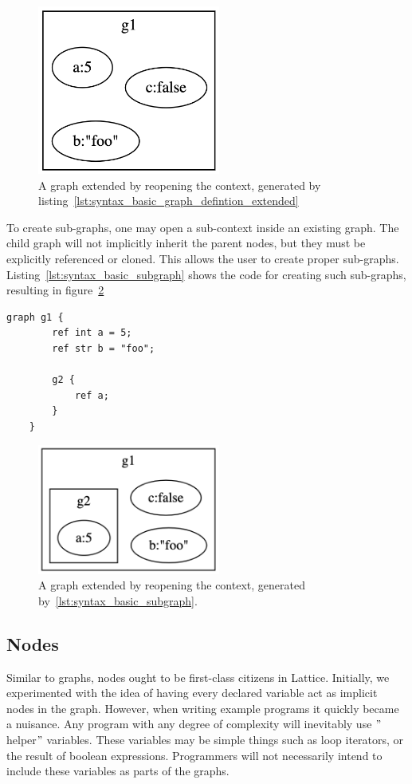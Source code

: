 \begin{figure}[H]
    \centering
    \includegraphics[width=6cm]{figures/syntax_section/syntax_basic_graph_extended}
    \caption{A graph extended by reopening the context, generated by listing~\ref{lst:syntax_basic_graph_defintion_extended}}
    \label{fig:syntax_basic_graph_extended}
\end{figure}

To create sub-graphs, one may open a sub-context inside an existing graph.
The child graph will not implicitly inherit the parent nodes, but they must be explicitly referenced or cloned.
This allows the user to create proper sub-graphs.
Listing~\ref{lst:syntax_basic_subgraph} shows the code for creating such sub-graphs, resulting in figure~\ref{fig:syntax_basic_subgraph}

\begin{lstlisting}[caption={Creating a sub-graph g2 in the context of g1},captionpos=b, label={lst:syntax_basic_subgraph}]
    graph g1 {
        ref int a = 5;
        ref str b = "foo";

        g2 {
            ref a;
        }
    }
\end{lstlisting}
\begin{figure}[H]
    \centering
    \includegraphics[width=6cm]{figures/syntax_section/syntax_basic_subgraph}
    \caption{A graph extended by reopening the context, generated by~\ref{lst:syntax_basic_subgraph}.}
    \label{fig:syntax_basic_subgraph}
\end{figure}

\subsection{Nodes}\label{subsec:syntax_nodes}
Similar to graphs, nodes ought to be first-class citizens in Lattice.
Initially, we experimented with the
idea of having every declared variable act as implicit nodes in the graph.
However, when writing example programs it quickly became a nuisance.
Any program with any degree of complexity will inevitably use \("\)helper\("\) variables.
These variables may be simple things such as loop iterators, or the result of boolean expressions.
Programmers will not necessarily intend to include these variables as parts of the graphs.


